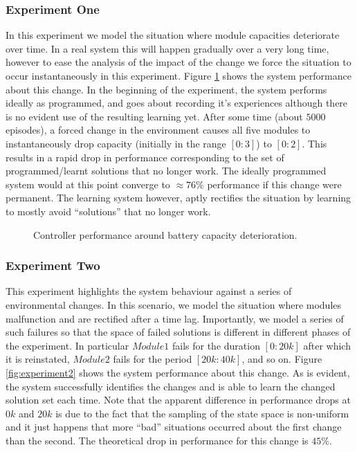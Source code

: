 \subsubsection{Experiment One}

In this experiment we model the situation where module capacities deteriorate over time. In a real system this will happen gradually over a very long time, however to ease the analysis of the impact of the change we force the situation to occur instantaneously in this experiment. Figure \ref{fig:experiment1} shows the system performance about this change. In the beginning of the experiment, the system performs ideally as programmed, and goes about recording it's experiences although there is no evident use of the resulting learning yet. After some time (about $5000$ episodes), a forced change in the environment causes all five modules to instantaneously drop capacity (initially in the range $[0:3]$) to $[0:2]$. This results in a rapid drop in performance corresponding to the set of programmed/learnt solutions that no longer work. The ideally programmed system would at this point converge to $\approx 76\%$ performance if this change were permanent. The learning system however, aptly rectifies the situation by learning to mostly avoid ``solutions'' that no longer work. 

\begin{figure}[ht]
\begin{center}

\end{center}
\caption{Controller performance around battery capacity deterioration.}
\label{fig:experiment1}
\end{figure}

\subsubsection{Experiment Two}

This experiment highlights the system behaviour against a series of environmental changes. In this scenario, we model the situation where modules malfunction and are rectified after a time lag. Importantly, we model a series of such failures so that the space of failed solutions is different in different phases of the experiment. In particular $Module1$ fails for the duration $[0:20k]$ after which it is reinstated, $Module2$ fails for the period $[20k:40k]$, and so on. Figure \ref{fig:experiment2} shows the system performance about this change. As is evident, the system successfully identifies the changes and is able to learn the changed solution set each time. Note that the apparent difference in performance drops at $0k$ and $20k$ is due to the fact that the sampling of the state space is non-uniform and it just happens that more ``bad'' situations occurred about the first change than the second. The theoretical drop in performance for this change is $45\%$. 

